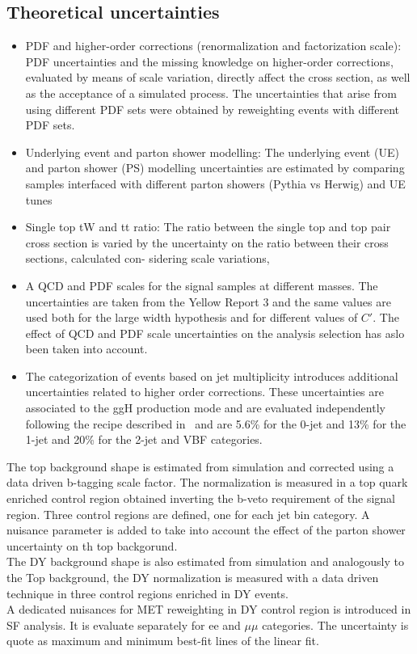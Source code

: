 \subsection*{ Theoretical uncertainties}
\begin{itemize}
\item PDF and higher-order corrections (renormalization and factorization scale): PDF
uncertainties and the missing knowledge on higher-order corrections, evaluated by
means of scale variation, directly affect the cross section, as well as the acceptance
of a simulated process. The uncertainties that arise from using different PDF sets
were obtained by reweighting events with different PDF sets.

\item Underlying event and parton shower modelling: The underlying event (UE) and
parton shower (PS) modelling uncertainties are estimated by comparing samples
interfaced with different parton showers (Pythia vs Herwig) and UE tunes

\item Single top tW and tt ratio: The ratio between the single top and top pair cross section
is varied by the uncertainty on the ratio between their cross sections, calculated con-
sidering scale variations,

\item A QCD and PDF scales for the signal samples at different masses. The uncertainties are taken from the Yellow Report 3 and the same values are used both for the large width hypothesis and for different values of $C'$. The effect of QCD and PDF scale uncertainties on the analysis selection has aslo been taken into account.

\item The categorization of events based on jet multiplicity introduces additional uncertainties related to higher order corrections. These uncertainties are associated to the ggH production mode and are evaluated independently following the recipe described in~\cite{Boughezal:2013oha} and are 5.6\% for the 0-jet and  13\% for the 1-jet and 20\% for the 2-jet and VBF categories.




\end{itemize}



The top background shape is estimated from simulation and corrected using a data driven b-tagging scale factor. The normalization is measured in a top quark enriched control region obtained inverting the b-veto requirement of the signal region. Three control regions are defined, one for each jet bin category. 
A nuisance parameter is added to take into account the effect of the parton shower uncertainty on th top backgorund. \\
The DY background shape is also estimated from simulation and analogously to the Top background, the DY normalization is measured with a data driven technique in three control regions enriched in DY events.\\
A dedicated nuisances for MET reweighting in DY control region is introduced in SF analysis. It is evaluate separately for ee and $\mu \mu$ categories. 
The uncertainty is quote as maximum and minimum best-fit lines of the linear fit.

